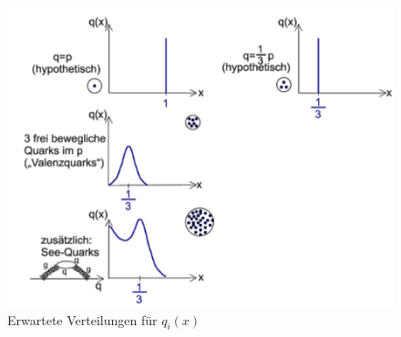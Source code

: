 \begin{figure}[!ht]
\centering
\includegraphics[width=.9\textwidth]{imgs/ep5-fig-6-9.pdf}
\caption{Erwartete Verteilungen für $q_i(x)$\label{fig:6.9}}
\end{figure}
